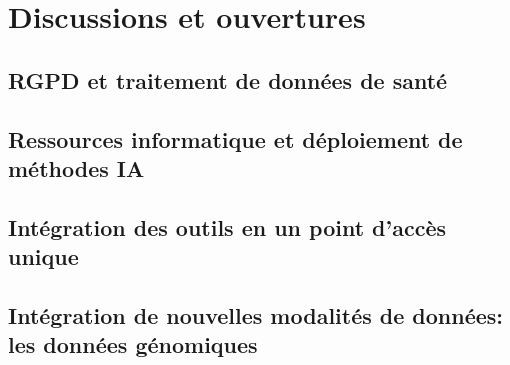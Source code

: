 \chapter{Discussions et ouvertures}
\section{RGPD et traitement de données de santé}
\section{Ressources informatique et déploiement de méthodes IA}
\section{Intégration des outils en un point d'accès unique}
\section{Intégration de nouvelles modalités de données: les données génomiques}